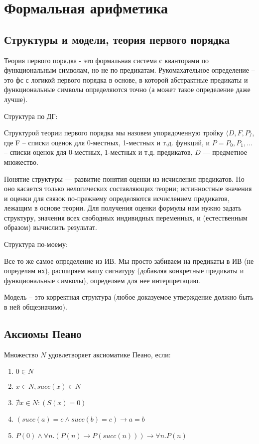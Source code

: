 \section{Формальная арифметика}
\label{sec-9}
\subsection{Структуры и модели, теория первого порядка}
\label{sec-9-1}
Теория первого порядка - это формальная система с кванторами по
функциональным символам, но не по предикатам. Рукомахательное
определение – это фс с логикой первого порядка в основе, в которой
абстрактные предикаты и функциональные символы определяются точно
(а может такое определение даже лучше).

Структура по ДГ:

Структурой теории первого порядка мы назовем упорядоченную тройку
$\langle D, F, P\rangle$, где F -- списки оценок для 0-местных, 1-местных и т.д.
функций, и $P = P_0, P_1,\dotsc$ -- списки оценок для 0-местных,
1-местных и т.д. предикатов, $D$ — предметное множество.

Понятие структуры — развитие понятия оценки из исчисления предикатов.
Но оно касается только нелогических составляющих теории; истинностные
значения и оценки для связок по-прежнему определяются исчислением
предикатов, лежащим в основе теории. Для получения оценки формулы
нам нужно задать структуру, значения всех свободных индивидных
переменных, и (естественным образом) вычислить результат.

Структура по-моему:

Все то же самое определение из ИВ. Мы просто забиваем на предикаты
в ИВ (не определям их), расширяем нашу сигнатуру (добавляя конкретные
предикаты и функциональные символы), определяем для нее интерпретацию.

Модель -- это корректная структура (любое доказуемое утверждение должно
быть в ней общезначимо).
\subsection{Аксиомы Пеано}
\label{sec-9-2}
Множество $N$ удовлетворяет аксиоматике Пеано, если:
\begin{enumerate}
\item $0 \in N$
\item $x \in N, succ(x) \in N$
\item $\nexists x \in N : (S(x) = 0)$
\item $(succ(a) = c \land succ(b) = c) \to a = b$
\item $P(0) \land \forall n.(P(n) \to P(succ(n))) \to \forall n.P(n)$
\end{enumerate}
